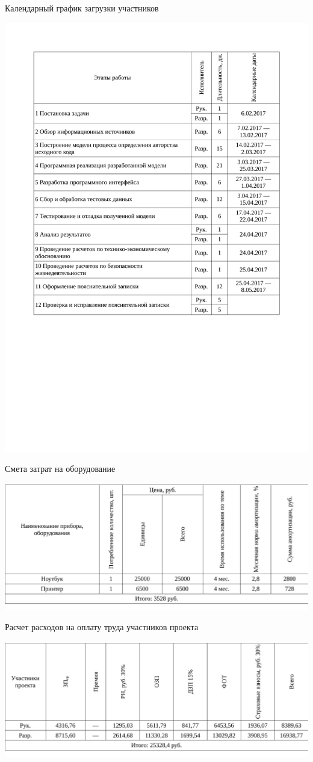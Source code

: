 \begin{table}[!ht]
\caption{Календарный график загрузки участников}
\centering
\includegraphics[page=1, width=1\linewidth]{schedule_3.pdf}
\label{tab:job_is_done_3}
\end{table}

\begin{table}[!ht]
\caption{Смета затрат на оборудование}
\centering
\includegraphics[page=1, width=1\linewidth]{schedule_4.pdf}
\label{tab:job_is_done_4}
\end{table}

\begin{table}[!ht]
\caption{Расчет расходов на оплату труда участников проекта}
\centering
\includegraphics[page=1, width=1\linewidth]{schedule_5.pdf}
\label{tab:job_is_done_5}
\end{table}

\clearpage
